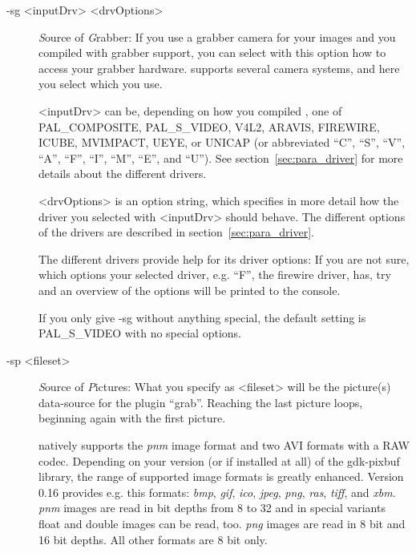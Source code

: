 \begin{description}

\item [-sg \textless{}inputDrv\textgreater{} \textless{}drvOptions\textgreater{}]
  {\em S}ource of {\em G}rabber: If you use a grabber camera for
  your images and you compiled \icewing{} with grabber support, you
  can select with this option how to access your grabber hardware.
  \icewing{} supports several camera systems, and here you select
  which you use.

  \textless{}inputDrv\textgreater{} can be, depending on how you
  compiled \icewing{}, one of PAL\_COMPOSITE, PAL\_S\_VIDEO, V4L2,
  ARAVIS, FIREWIRE, ICUBE, MVIMPACT, UEYE, or UNICAP (or
  abbreviated ``C'', ``S'', ``V'', ``A'', ``F'', ``I'', ``M'',
  ``E'', and ``U''). See section~\ref{sec:para_driver} for more
  details about the different drivers.

  \textless{}drvOptions\textgreater{} is an option string, which
  specifies in more detail how the driver you selected with
  \textless{}inputDrv\textgreater{} should behave. The different
  options of the drivers are described in section~\ref{sec:para_driver}.

  The different drivers provide help for its driver options: If you
  are not sure, which options your selected driver, e.g. ``F'', the
  firewire driver, has, try
  \sS
  \sE
  and an overview of the options will be printed to the console.

  If you only give -sg without anything special, the default setting
  is PAL\_S\_VIDEO with no special options. 

\item[-sp \textless{}fileset\textgreater{}]
  {\em S}ource of {\em P}ictures: What you specify as
  \textless{}fileset\textgreater{} will be the picture(s)
  data-source for the plugin ``grab''. Reaching the last picture
  \icewing{} loops, beginning again with the first picture.

  \icewing{} natively supports the \emph{pnm} image
  format and two AVI formats with a RAW codec. Depending on your
  version (or if installed at all) of the gdk-pixbuf library, the
  range of supported image formats is greatly enhanced. Version 0.16
  provides e.g. this formats: \emph{bmp}, \emph{gif}, \emph{ico},
  \emph{jpeg}, \emph{png}, \emph{ras}, \emph{tiff}, and
  \emph{xbm}. \emph{pnm} images are read in bit depths from 8 to 32
  and in special variants float and double images can be read,
  too. \emph{png} images are read in 8 bit and 16 bit depths. All
  other formats are 8 bit only.


\end{description}
